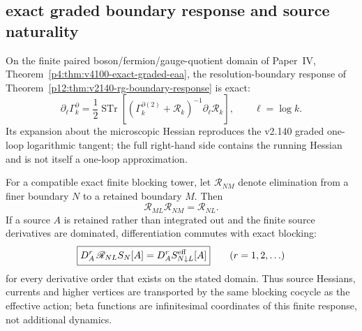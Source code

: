\documentclass[12pt,a4paper]{article}
\begin{document}
\subsection{exact graded boundary response and source naturality}
\label{p12:sec:v2141-exact-graded-boundary-response}

\begin{theorem}
\label{p12:thm:v2141-exact-graded-boundary-flow}
On the finite paired boson/fermion/gauge-quotient domain of
Paper~IV, Theorem~\ref{p4:thm:v4100-exact-graded-eaa}, the resolution-boundary
response of Theorem~\ref{p12:thm:v2140-rg-boundary-response} is exact:
\begin{equation}
\label{p12:eq:v2141-exact-graded-boundary-flow}
 \boxed{
 \partial_{\ell}\Gamma_k^{\partial}
 =\frac12\operatorname{STr}\left[
  (\Gamma_k^{\partial(2)}+\mathcal R_k)^{-1}
  \partial_{\ell}\mathcal R_k\right],\qquad \ell=\log k .}
\end{equation}
Its expansion about the microscopic Hessian reproduces the v2.140 graded
one-loop logarithmic tangent; the full right-hand side contains the running
Hessian and is not itself a one-loop approximation.
\end{theorem}

\begin{theorem}
\label{p12:thm:v2141-blocking-source-naturality}
For a compatible exact finite blocking tower, let
$\mathscr R_{NM}$ denote elimination from a finer boundary $N$ to a retained
boundary $M$.  Then
\begin{equation}
\label{p12:eq:v2141-blocking-composition}
 \boxed{\mathscr R_{ML}\mathscr R_{NM}=\mathscr R_{NL}.}
\end{equation}
If a source $A$ is retained rather than integrated out and the finite source
derivatives are dominated, differentiation commutes with exact blocking:
\begin{equation}
\label{p12:eq:v2141-source-naturality}
 \boxed{
 D_A^r\,\mathscr R_{NL}S_N[A]
 =D_A^r S^{\rm eff}_{N\downarrow L}[A]}
 \qquad(r=1,2,\ldots)
\end{equation}
for every derivative order that exists on the stated domain.  Thus source
Hessians, currents and higher vertices are transported by the same blocking
cocycle as the effective action; beta functions are infinitesimal coordinates
of this finite response, not additional dynamics.
\end{theorem}
\end{document}

